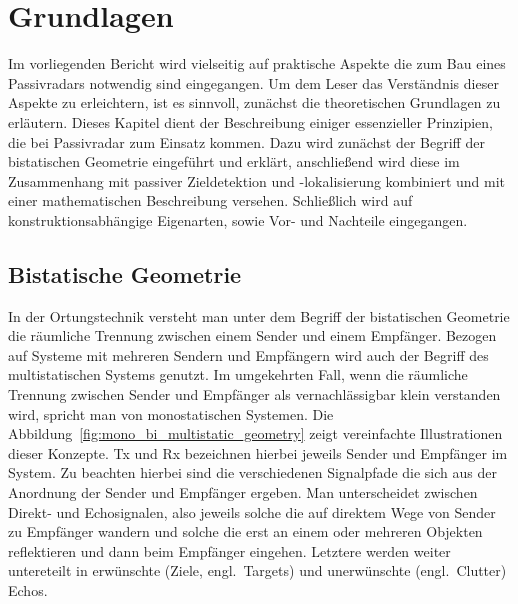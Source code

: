 \chapter{Grundlagen}

Im vorliegenden Bericht wird vielseitig auf praktische Aspekte die zum Bau eines Passivradars notwendig sind eingegangen. Um dem Leser das Verständnis dieser Aspekte zu erleichtern, ist es sinnvoll, zunächst die theoretischen Grundlagen zu erläutern. Dieses Kapitel dient der Beschreibung einiger essenzieller Prinzipien, die bei Passivradar zum Einsatz kommen. Dazu wird zunächst der Begriff der bistatischen Geometrie eingeführt und erklärt, anschließend wird diese im Zusammenhang mit passiver Zieldetektion und -lokalisierung kombiniert und mit einer mathematischen Beschreibung versehen. Schließlich wird auf konstruktionsabhängige Eigenarten, sowie Vor- und Nachteile eingegangen.

\section{Bistatische Geometrie}

In der Ortungstechnik versteht man unter dem Begriff der bistatischen Geometrie die räumliche Trennung zwischen einem Sender und einem Empfänger. Bezogen auf Systeme mit mehreren Sendern und Empfängern wird auch der Begriff des multistatischen Systems genutzt. Im umgekehrten Fall, wenn die räumliche Trennung zwischen Sender und Empfänger als vernachlässigbar klein verstanden wird, spricht man von monostatischen Systemen. Die Abbildung~\ref{fig:mono_bi_multistatic_geometry} zeigt vereinfachte Illustrationen dieser Konzepte. Tx und Rx bezeichnen hierbei jeweils Sender und Empfänger im System. Zu beachten hierbei sind die verschiedenen Signalpfade die sich aus der Anordnung der Sender und Empfänger ergeben. Man unterscheidet zwischen Direkt- und Echosignalen, also jeweils solche die auf direktem Wege von Sender zu Empfänger wandern und solche die erst an einem oder mehreren Objekten reflektieren und dann beim Empfänger eingehen. Letztere werden weiter untereteilt in erwünschte (Ziele, engl.\ Targets) und unerwünschte (engl.\ Clutter) Echos.

